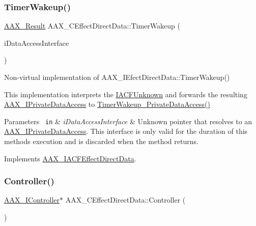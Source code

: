 \subsubsection{\texorpdfstring{TimerWakeup()}{TimerWakeup()}}
{\footnotesize\ttfamily \mbox{\hyperlink{a00392_a4d8f69a697df7f70c3a8e9b8ee130d2f}{A\+A\+X\+\_\+\+Result}} A\+A\+X\+\_\+\+C\+Effect\+Direct\+Data\+::\+Timer\+Wakeup (\begin{DoxyParamCaption}\item[{\mbox{\hyperlink{a01409}{I\+A\+C\+F\+Unknown}} $\ast$}]{i\+Data\+Access\+Interface }\end{DoxyParamCaption})\hspace{0.3cm}{\ttfamily [virtual]}}



Non-\/virtual implementation of A\+A\+X\+\_\+\+I\+Efect\+Direct\+Data\+::\+Timer\+Wakeup() 

This implementation interprets the \mbox{\hyperlink{a01409}{I\+A\+C\+F\+Unknown}} and forwards the resulting \mbox{\hyperlink{a01865}{A\+A\+X\+\_\+\+I\+Private\+Data\+Access}} to \mbox{\hyperlink{a01473_addd263d3a410d5c26148cee306cc7297}{Timer\+Wakeup\+\_\+\+Private\+Data\+Access()}}


\begin{DoxyParams}[1]{Parameters}
\mbox{\texttt{ in}}  & {\em i\+Data\+Access\+Interface} & Unknown pointer that resolves to an \mbox{\hyperlink{a01865}{A\+A\+X\+\_\+\+I\+Private\+Data\+Access}}. This interface is only valid for the duration of this method\textquotesingle{}s execution and is discarded when the method returns. \\
\hline
\end{DoxyParams}


Implements \mbox{\hyperlink{a01661_afb4fa2c566547d7bd303166cf50741bb}{A\+A\+X\+\_\+\+I\+A\+C\+F\+Effect\+Direct\+Data}}.

\mbox{\label{a01473_a33ddee1a300bb3f2584fa224975d362b}} 
\subsubsection{\texorpdfstring{Controller()}{Controller()}}
{\footnotesize\ttfamily \mbox{\hyperlink{a01789}{A\+A\+X\+\_\+\+I\+Controller}}$\ast$ A\+A\+X\+\_\+\+C\+Effect\+Direct\+Data\+::\+Controller (\begin{DoxyParamCaption}\item[{void}]{ }\end{DoxyParamCaption})}



